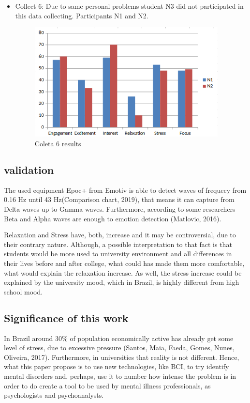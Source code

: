 \documentclass[12pt,openright,a4paper]{article}
\begin{document}
\begin{itemize}
\item Collect 6: Due to same personal problems student N3 did not participated in this data collecting. Participants N1 and N2.  
\begin{figure}[H]
	\centering
	\includegraphics[width=10cm]{./Coleta6.png}
	\caption{Coleta 6 results}
\end{figure}

\end{itemize}


\subsection{validation}
The used equipment Epoc+ from Emotiv is able to detect waves of frequecy from 0.16 Hz until 43 Hz(Comparison chart, 2019), that means it can capture from Delta waves up to Gamma waves. Furthermore, according to some researchers Beta and Alpha waves are enough to emotion detection (Matlovic, 2016).  

Relaxation and Stress have, both, increase and it may be controversial, due to their contrary nature. Although, a possible interpretation to that fact is that students would be more used to university environment and all differences in their lives before and after college, what could has made them more comfortable, what would explain the relaxation increase. As well, the stress increase could be explained  by the university mood, which in Brazil, is highly different from high school mood.
\newpage
\subsection{Significance of this work}
In Brazil around 30\% of population economically active has already get some level of stress, due to excessive pressure (Santos, Maia, Faeda, Gomes, Nunes, Oliveira, 2017). Furthermore, in universities that reality is not different. Hence, what this paper propose is to use new technologies, like BCI, to try identify mental disorders and, perhaps, use it to number how intense the problem is in order to do create a tool to be used by mental illness professionals, as psychologists and psychoanalysts.
\end{document}
